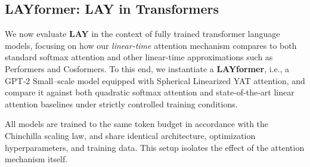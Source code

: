 \documentclass{article}
\begin{document}
\subsection{LAYformer: LAY in Transformers}
\label{subsec:LAYformer}

We now evaluate \textbf{LAY} in the context of fully trained transformer language models, focusing on how our
\emph{linear‑time} attention mechanism compares to both standard softmax attention and other linear-time approximations such as Performers and Cosformers.
To this end, we instantiate a \textbf{LAYformer}, i.e., a GPT‑2 Small–scale model equipped with Spherical
Linearized YAT attention, and compare it against both quadratic softmax attention and state‑of‑the‑art
linear attention baselines under strictly controlled training conditions.

All models are trained to the same token budget in accordance with the Chinchilla scaling law, and share
identical architecture, optimization hyperparameters, and training data. This setup isolates the effect
of the attention mechanism itself.
\begin{table}[htbp]
\centering
\small
\caption{\small{
Validation performance comparison of attention mechanisms after satisfying the Chinchilla scaling law. Full model details available in Appendix \ref{app:experiments}.
}}
\label{tab:attention-val-comparison}
\end{table}
\end{document}
